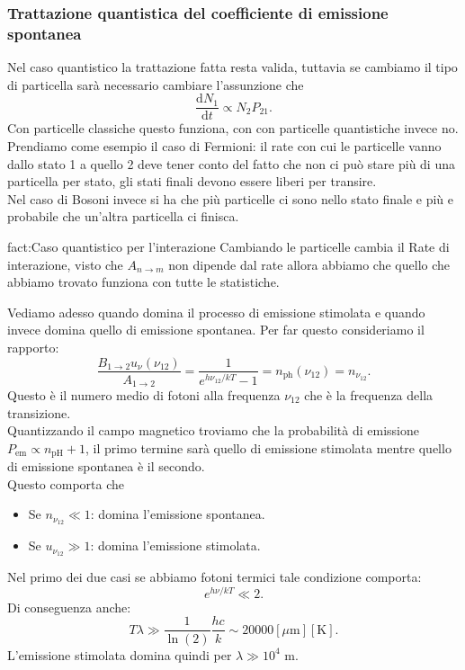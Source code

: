 \subsubsection{Trattazione quantistica del coefficiente di emissione spontanea}%
Nel caso quantistico la trattazione fatta resta valida, tuttavia se cambiamo il tipo di particella sarà necessario cambiare l'assunzione che 
\[
\frac{\text{d} N_1}{\text{d} t} \propto N_{2}P_{21}
.\]   
Con particelle classiche questo funziona, con con particelle quantistiche invece no. \\
Prendiamo come esempio il caso di Fermioni: il rate con cui le particelle vanno dallo stato 1 a quello 2 deve tener conto del fatto che non ci può stare più di una particella per stato, gli stati finali devono essere liberi per transire.\\
Nel caso di Bosoni invece si ha che più particelle ci sono nello stato finale e più e probabile che un'altra particella ci finisca.
\begin{fact}{fact:Caso quantistico per l'interazione}
Cambiando le particelle cambia il Rate di interazione, visto che $A_{n\to m}$ non dipende dal rate allora abbiamo che quello che abbiamo trovato funziona con tutte le statistiche.
\end{fact}
Vediamo adesso quando domina il processo di emissione stimolata e quando invece domina quello di emissione spontanea. Per far questo consideriamo il rapporto:
\[
    \frac{B_{1\to 2}u_\nu(\nu_{12})}{A_{1\to 2}} = \frac{1}{e^{h\nu_{12} /kT}-1}
    = n_\text{ph}(\nu_{12}) = n_{\nu_{12}}
.\] 
Questo è il numero medio di fotoni alla frequenza $\nu_{12}$  che è la frequenza della transizione.\\
Quantizzando il campo magnetico troviamo che la probabilità di emissione $P_\text{em} \propto n_\text{pH} + 1$, il primo termine sarà quello di emissione stimolata mentre quello di emissione spontanea è il secondo.\\
Questo comporta che 
\begin{itemize}
    \item Se $n_{\nu_{12}}\ll 1$: domina l'emissione spontanea.
    \item Se $u_{\nu_{12}}\gg 1$: domina l'emissione stimolata.
\end{itemize}
Nel primo dei due casi se abbiamo fotoni termici tale condizione comporta:
\[
e^{h\nu /kT}\ll 2
.\] 
Di conseguenza anche:
\[
    T\lambda\gg \frac{1}{\ln(2)}\frac{hc}{k}\sim 20000 [\mu\text{m}][\text{K}]
.\] 
L'emissione stimolata domina quindi per $\lambda\gg 10^4$ m.\\
